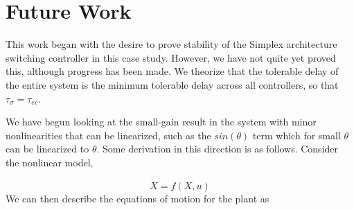 \documentclass[conference]{IEEEtran}
\begin{document}
%




\section{Future Work}
This work began with the desire to prove stability of the Simplex architecture switching controller in this case study.  However, we have not quite yet proved this, although progress has been made.  We theorize that the tolerable delay of the entire system is the minimum tolerable delay across all controllers, so that $\tau_{\sigma}=\tau_{ec}$.

We have begun looking at the small-gain result in the system with minor nonlinearities that can be linearized, such as the $sin(\theta)$ term which for small $\theta$ can be linearized to $\theta$.  Some derivation in this direction is as follows.  Consider the nonlinear model,

\begin{equation}
\dot{X}=f\left(X,u\right)
\end{equation} We can then describe the equations of motion for the plant as 
\end{document}
